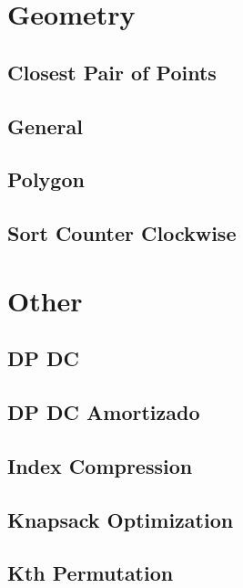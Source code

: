 \section{Geometry}
\subsection{	Closest Pair of Points}
\raggedbottom
\hrulefill
\subsection{	General}
\raggedbottom
\hrulefill
\subsection{	Polygon}
\raggedbottom
\hrulefill
\subsection{	Sort Counter Clockwise}
\raggedbottom
\hrulefill

\section{Other}
\subsection{	DP DC}
\raggedbottom
\hrulefill
\subsection{	DP DC Amortizado}
\raggedbottom
\hrulefill
\subsection{	Index Compression}
\raggedbottom
\hrulefill
\subsection{	Knapsack Optimization}
\raggedbottom
\hrulefill
\subsection{	Kth Permutation}
\raggedbottom
\hrulefill
